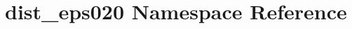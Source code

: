 \hypertarget{namespacedist__eps020}{}\section{dist\+\_\+eps020 Namespace Reference}
\label{namespacedist__eps020}
